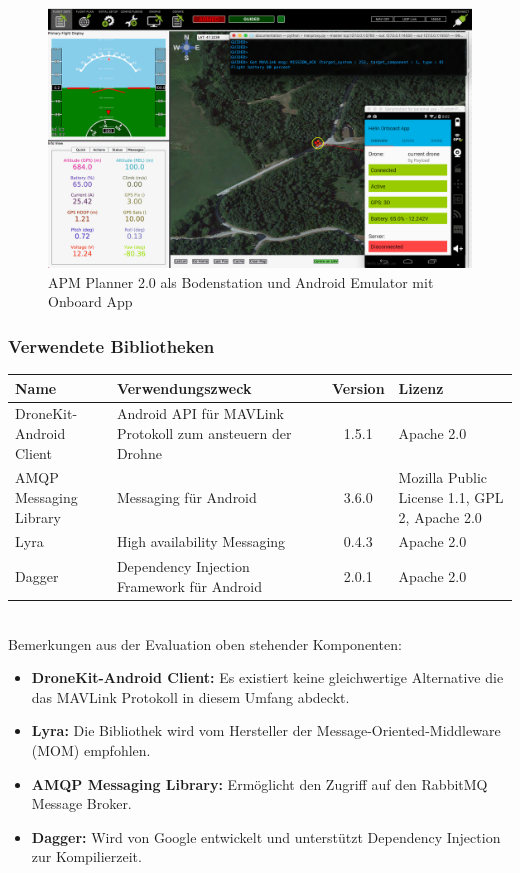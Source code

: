 \begin{figure}[H]
	\includegraphics[width=1.0\textwidth]{images/test-setup-onboard.png}
	\caption{APM Planner 2.0 als Bodenstation und Android Emulator mit Onboard App}
	\label{fig:test-setup-onboard}
\end{figure}

\subsubsection{Verwendete Bibliotheken}
\begin{tabularx}{\textwidth}{|X|X|c|X|}
	\hline
	\textbf{Name} & \textbf{Verwendungszweck} & \textbf{Version} & \textbf{Lizenz} \\
	\hline \hline
	DroneKit-Android Client & Android API für \Gls{MAVLink} Protokoll zum ansteuern der Drohne & 1.5.1 & Apache 2.0\\
	\hline 
	AMQP Messaging Library & Messaging für Android & 3.6.0 &  Mozilla Public License 1.1, GPL 2,  Apache 2.0 \\
	\hline 
	Lyra  & High availability Messaging & 0.4.3 &  Apache 2.0 \\
	\hline 
	Dagger  & Dependency Injection Framework für Android & 2.0.1 &  Apache 2.0 \\
	\hline 
\end{tabularx} \\

Bemerkungen aus der Evaluation oben stehender Komponenten:
\begin{itemize}
	\item{\textbf{DroneKit-Android Client:} Es existiert keine gleichwertige Alternative die das \Gls{MAVLink} Protokoll in diesem Umfang abdeckt.}
	\item{\textbf{Lyra:} Die Bibliothek wird vom Hersteller der Message-Oriented-Middleware (\Gls{MOM}) empfohlen. \cite[]{lyra-page} }
	\item{\textbf{AMQP Messaging Library:} Ermöglicht den Zugriff auf den RabbitMQ Message Broker.}
	\item{\textbf{Dagger:} Wird von Google entwickelt und unterstützt Dependency Injection zur Kompilierzeit.}
\end{itemize}


